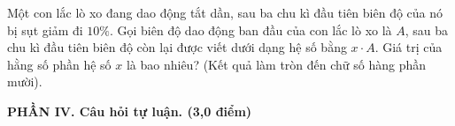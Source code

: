 \begin{ex}%
	Một con lắc lò xo đang dao động tắt dần, sau ba chu kì đầu tiên biên độ của nó bị sụt giảm đi $10\%$. Gọi biên độ dao động ban đầu của con lắc lò xo là $A$, sau ba chu kì đầu tiên biên độ còn lại được viết dưới dạng hệ số bằng $x \cdot A$. Giá trị của hằng số phần hệ số $x$ là bao nhiêu? (Kết quả làm tròn đến chữ số hàng phần mười).
\end{ex}


\noindent \textbf{PHẦN IV. Câu hỏi tự luận. (3,0 điểm)}
\vspace{0.2cm}

